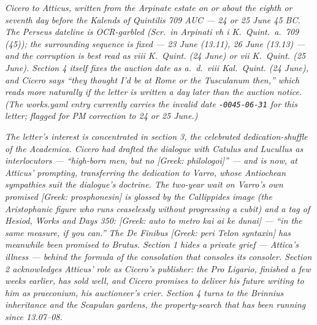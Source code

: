 
\textit{Cicero to Atticus, written from the Arpinate
estate on or about the eighth or seventh day before
the Kalends of Quintilis 709 AUC --- 24 or 25 June 45
BC. The Perseus dateline is OCR-garbled
(\textit{Scr.\ in Arpinati vh i K.\ Quint.\ a.\ 709
(45)}); the surrounding sequence is fixed --- 23 June
(13.11), 26 June (13.13) --- and the corruption is
best read as \textit{viii K.\ Quint.} (24 June) or
\textit{vii K.\ Quint.} (25 June). Section 4 itself
fixes the auction date as \textit{a.\ d.\ viii Kal.\
Quint.} (24 June), and Cicero says ``they thought I'd
be at Rome or the Tusculanum then,'' which reads more
naturally if the letter is written a day later than
the auction notice. (The works.yaml entry currently
carries the invalid date \texttt{-0045-06-31} for this
letter; flagged for PM correction to 24 or 25 June.)}

\textit{The letter's interest is concentrated in
section 3, the celebrated dedication-shuffle of the
\textit{Academica}. Cicero had drafted the dialogue
with Catulus and Lucullus as interlocutors ---
``high-born men, but no \textit{[Greek: philologoi]}''
--- and is now, at Atticus' prompting, transferring
the dedication to Varro, whose Antiochean
sympathies suit the dialogue's doctrine. The
two-year wait on Varro's own promised
\textit{[Greek: prosphonesin]} is glossed by the
Callippides image (the Aristophanic figure who runs
ceaselessly without progressing a cubit) and a tag of
Hesiod, \textit{Works and Days} 350: \textit{[Greek:
auto to metro kai ai ke dunai]} --- ``in the same
measure, if you can.'' The \textit{De Finibus}
\textit{[Greek: peri Telon syntaxin]} has meanwhile
been promised to Brutus. Section 1 hides a private
grief --- Attica's illness --- behind the formula of
the consolation that consoles its consoler. Section 2
acknowledges Atticus' role as Cicero's publisher: the
\textit{Pro Ligario}, finished a few weeks earlier,
has sold well, and Cicero promises to deliver his
future writing to him as \textit{praeconium}, his
auctioneer's crier. Section 4 turns to the Brinnius
inheritance and the Scapulan gardens, the
property-search that has been running since
13.07--08.}
